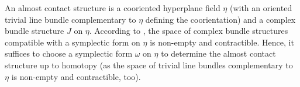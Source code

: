 \begin{definition}
    An almost contact structure is a cooriented hyperplane field $\eta$ (with an oriented trivial line bundle complementary to $\eta$ defining the coorientation) 
    and a complex bundle structure $J$ on $\eta$.
    According to \cite[Prop 2.4.5]{Geiges08}, the space of complex bundle structures compatible with a symplectic form on $\eta$ is non-empty and contractible. 
    Hence, it suffices to choose a symplectic form $\omega$ on $\eta$ to determine the almost contact structure up to homotopy 
    (as the space of trivial line bundles complementary to $\eta$ is non-empty and contractible, too).
\end{definition}

\begin{comment} %
Let $\epsilon > 0$. The, $\tilde \alpha_\epsilon \coloneqq \epsilon x_1 \d \theta_1 - \epsilon x_2 \d \theta_2 + \alpha$ is a contact form.
By Gray stability, all these contact structures are isotopic, so the underlying almost contact structures are homotopic, too. 
For $\epsilon = 0$, the kernel of this expression is the hyperplane field $\xi \oplus TT^2$.

Consider the form $\d \alpha \oplus \Omega$ where $\Omega$ is a volume form on $T^2$. It is a symplectic form on $\xi \oplus TT^2$.

The trivial line bundle for the coorientation can just be pulled back from $M$ to $M \times T^2$. 
As a result, $(\xi \oplus TT^2, \alpha \oplus \Omega)$ is an almost contact structure that is homotopic to the almost contact structures for $\epsilon > 0$.
Thus, up to homotopy, the almost contact structure of the Bourgeois form is given by 
\[
    \xi \oplus TT^2, \d \alpha \wedge \Omega.
\]
As a result, all of our constructions just return the 
\end{comment}

